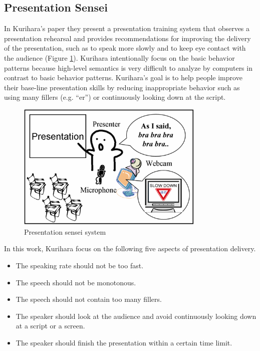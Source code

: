 \subsection{Presentation Sensei}
\par In Kurihara's paper they present a presentation training system that observes a presentation rehearsal and provides recommendations for improving the delivery of the presentation, such as to speak more slowly and to keep eye contact with the audience (Figure \ref{fig:sensei}). Kurihara intentionally focus on the basic behavior patterns because high-level semantics is very difficult to analyze by computers in contrast to basic behavior patterns. Kurihara's goal is to help people improve their base-line presentation skills by reducing inappropriate behavior such as using many fillers (e.g. “er”) or continuously looking down at the script.

\begin{figure}[htbp]
  \centering\includegraphics[width=0.8\textwidth]{./img/sensei.png}
  \caption[Presentation sensei system]{Presentation sensei system \cite{Kurihara2007}}
  \label{fig:sensei}
\end{figure}

\par In this work, Kurihara focus on the following five aspects of presentation delivery.
\begin{itemize}
  \item The speaking rate should not be too fast.
  \item The speech should not be monotonous.
  \item The speech should not contain too many fillers.
  \item The speaker should look at the audience and avoid continuously looking down at a script or a screen.
  \item The speaker should finish the presentation within a certain time limit.
\end{itemize}

